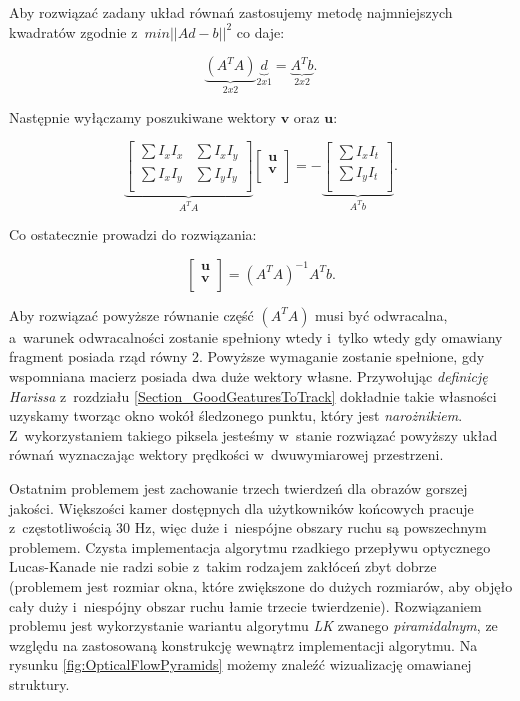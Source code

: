     Aby rozwiązać zadany układ równań zastosujemy metodę najmniejszych kwadratów zgodnie z~$min||Ad - b||^{2}$ co daje:

    \[
      \underbrace{(A^{T}A)}_{2x2} \underbrace{d}_{2x1} = \underbrace{A^{T}b}_{2x2}.
    \]

    Następnie wyłączamy poszukiwane wektory $\mathbf{v}$ oraz $\mathbf{u}$:

    \[
      \underbrace{
        \begin{bmatrix}
          \sum I_{x} I_{x} & \sum I_{x} I_{y} \\
          \sum I_{x} I_{y} & \sum I_{y} I_{y} \\
        \end{bmatrix}
      }_{A^{T}A}
      \begin{bmatrix}
        \mathbf{u} \\
        \mathbf{v} \\
      \end{bmatrix} =
      -\underbrace{
        \begin{bmatrix}
          \sum I_{x} I_{t} \\
          \sum I_{y} I_{t} \\
        \end{bmatrix}
      }_{A^{T}b}.
    \]

    Co ostatecznie prowadzi do rozwiązania:

    \[
      \begin{bmatrix}
        \mathbf{u} \\
        \mathbf{v} \\
      \end{bmatrix} = (A^{T}A)^{-1} A^{T}b.
    \]

    Aby rozwiązać powyższe równanie część $(A^{T}A)$ musi być odwracalna, a~warunek odwracalności zostanie spełniony wtedy i~tylko wtedy gdy omawiany fragment posiada rząd równy $2$. Powyższe wymaganie zostanie spełnione, gdy wspomniana macierz posiada dwa duże wektory własne. Przywołując \textit{definicję Harissa} z~rozdziału \ref{Section_GoodGeaturesToTrack} dokładnie takie własności uzyskamy tworząc okno wokół śledzonego punktu, który jest \textit{narożnikiem}. Z~wykorzystaniem takiego piksela jesteśmy w~stanie rozwiązać powyższy układ równań wyznaczając wektory prędkości w~dwuwymiarowej przestrzeni.

    Ostatnim problemem jest zachowanie trzech twierdzeń dla obrazów gorszej jakości. Większości kamer dostępnych dla użytkowników końcowych pracuje z~częstotliwością 30 Hz, więc duże i~niespójne obszary ruchu są powszechnym problemem. Czysta implementacja algorytmu rzadkiego przepływu optycznego Lucas-Kanade nie radzi sobie z~takim rodzajem zakłóceń zbyt dobrze (problemem jest rozmiar okna, które zwiększone do dużych rozmiarów, aby objęło cały duży i~niespójny obszar ruchu łamie trzecie twierdzenie). Rozwiązaniem problemu jest wykorzystanie wariantu algorytmu \textit{LK} zwanego \textit{piramidalnym}, ze względu na zastosowaną konstrukcję wewnątrz implementacji algorytmu. Na rysunku \ref{fig:OpticalFlowPyramids} możemy znaleźć wizualizację omawianej struktury.

